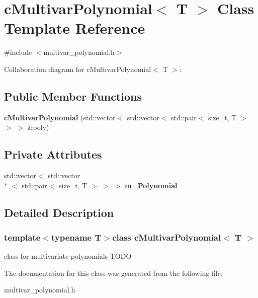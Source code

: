 \hypertarget{classcMultivarPolynomial}{\section{c\-Multivar\-Polynomial$<$ T $>$ Class Template Reference}
\label{classcMultivarPolynomial}
}


{\ttfamily \#include $<$multivar\-\_\-polynomial.\-h$>$}



Collaboration diagram for c\-Multivar\-Polynomial$<$ T $>$\-:
\subsection*{Public Member Functions}
\begin{DoxyCompactItemize}
\item 
\hypertarget{classcMultivarPolynomial_a2389964d548cd22f0c214bc09a868b63}{{\bfseries c\-Multivar\-Polynomial} (std\-::vector$<$ std\-::vector$<$ std\-::pair$<$ size\-\_\-t, T $>$ $>$ $>$ \&poly)}\label{classcMultivarPolynomial_a2389964d548cd22f0c214bc09a868b63}

\end{DoxyCompactItemize}
\subsection*{Private Attributes}
\begin{DoxyCompactItemize}
\item 
\hypertarget{classcMultivarPolynomial_a01b0fbc4aee3f1c77b9c5de8b89e5768}{std\-::vector$<$ std\-::vector\\*
$<$ std\-::pair$<$ size\-\_\-t, T $>$ $>$ $>$ {\bfseries m\-\_\-\-Polynomial}}\label{classcMultivarPolynomial_a01b0fbc4aee3f1c77b9c5de8b89e5768}

\end{DoxyCompactItemize}


\subsection{Detailed Description}
\subsubsection*{template$<$typename T$>$class c\-Multivar\-Polynomial$<$ T $>$}

class for multivariate polynomials T\-O\-D\-O 

The documentation for this class was generated from the following file\-:\begin{DoxyCompactItemize}
\item 
multivar\-\_\-polynomial.\-h\end{DoxyCompactItemize}
